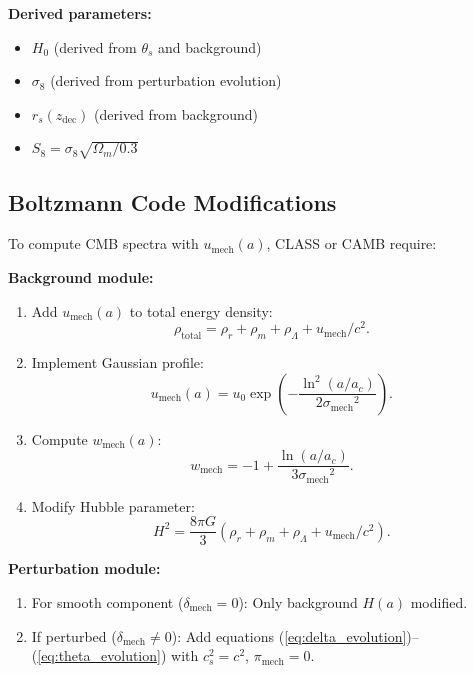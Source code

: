\documentclass[11pt,a4paper]{article}
\newcommand{\umech}{\ensuremath{u_{\mathrm{mech}}}}
\newcommand{\wmech}{\ensuremath{w_{\mathrm{mech}}}}
\newcommand{\ac}{\ensuremath{a_c}}
\newcommand{\sigmamech}{\ensuremath{\sigma_{\mathrm{mech}}}}
\newcommand{\zdec}{\ensuremath{z_{\mathrm{dec}}}}
\newcommand{\rs}{\ensuremath{r_s}}
\newcommand{\Omm}{\ensuremath{\Omega_m}}
\theoremstyle{definition}
\theoremstyle{remark}
\begin{document}
\textbf{Derived parameters:}
\begin{itemize}[leftmargin=*, itemsep=0.2em]
\item $H_0$ (derived from $\theta_s$ and background)
\item $\sigma_8$ (derived from perturbation evolution)
\item $\rs(\zdec)$ (derived from background)
\item $S_8 = \sigma_8 \sqrt{\Omm/0.3}$
\end{itemize}

\subsection{Boltzmann Code Modifications}
\label{sec:boltzmann_modifications}

To compute CMB spectra with $\umech(a)$, CLASS \cite{CLASS} or CAMB \cite{CAMB} require:

\textbf{Background module:}
\begin{enumerate}[leftmargin=*, itemsep=0.2em]
\item Add $\umech(a)$ to total energy density:
\begin{equation}
\rho_{\mathrm{total}} = \rho_r + \rho_m + \rho_\Lambda + \umech/c^2.
\end{equation}

\item Implement Gaussian profile:
\begin{equation}
\umech(a) = u_0 \exp\left( -\frac{\ln^2(a/\ac)}{2\sigmamech^2} \right).
\end{equation}

\item Compute $\wmech(a)$:
\begin{equation}
\wmech = -1 + \frac{\ln(a/\ac)}{3\sigmamech^2}.
\end{equation}

\item Modify Hubble parameter:
\begin{equation}
H^2 = \frac{8\pi G}{3}(\rho_r + \rho_m + \rho_\Lambda + \umech/c^2).
\end{equation}
\end{enumerate}

\textbf{Perturbation module:}
\begin{enumerate}[leftmargin=*, itemsep=0.2em]
\item For smooth component ($\delta_{\mathrm{mech}} = 0$): Only background $H(a)$ modified.
\item If perturbed ($\delta_{\mathrm{mech}} \neq 0$): Add equations (\ref{eq:delta_evolution})--(\ref{eq:theta_evolution}) with $c_s^2 = c^2$, $\pi_{\mathrm{mech}} = 0$.
\end{enumerate}
\end{document}
